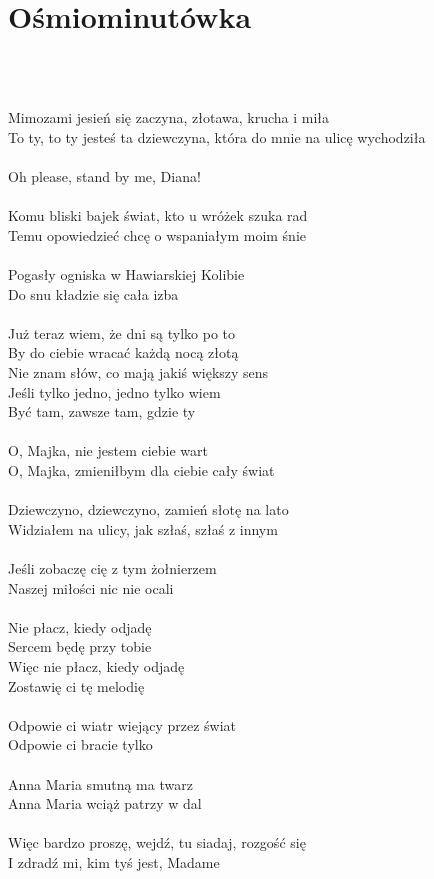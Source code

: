 \documentclass[a5paper, 10pt]{book}
\begin{document}
\newpage
\section{Ośmiominutówka}\textcolor{lightgray}{\textit{}}\\~\\
\begin{minipage}[t]{0.82\textwidth}
  Mimozami jesień się zaczyna, złotawa, krucha i miła\\
  To ty, to ty jesteś ta dziewczyna, która do mnie na ulicę wychodziła\\
  \\
  Oh please, stand by me, Diana!\\
  \\
  Komu bliski bajek świat, kto u wróżek szuka rad\\
  Temu opowiedzieć chcę o wspaniałym moim śnie\\
  \\
  Pogasły ogniska w Hawiarskiej Kolibie\\
  Do snu kładzie się cała izba\\
  \\
  Już teraz wiem, że dni są tylko po to\\
  By do ciebie wracać każdą nocą złotą\\
  Nie znam słów, co mają jakiś większy sens\\
  Jeśli tylko jedno, jedno tylko wiem\\
  Być tam, zawsze tam, gdzie ty\\
  \\
  O, Majka, nie jestem ciebie wart\\
  O, Majka, zmieniłbym dla ciebie cały świat\\
  \\
  Dziewczyno, dziewczyno, zamień słotę na lato\\
  Widziałem na ulicy, jak szłaś, szłaś z innym\\
  \\
  Jeśli zobaczę cię z tym żołnierzem\\
  Naszej miłości nic nie ocali\\
  \\
  Nie płacz, kiedy odjadę\\
  Sercem będę przy tobie\\
  Więc nie płacz, kiedy odjadę\\
  Zostawię ci tę melodię\\
  \\
  Odpowie ci wiatr wiejący przez świat\\
  Odpowie ci bracie tylko\\
  \\
  Anna Maria smutną ma twarz\\
  Anna Maria wciąż patrzy w dal\\
  \\
  Więc bardzo proszę, wejdź, tu siadaj, rozgość się\\
  I zdradź mi, kim tyś jest, Madame\\

\end{minipage}
\end{document}
